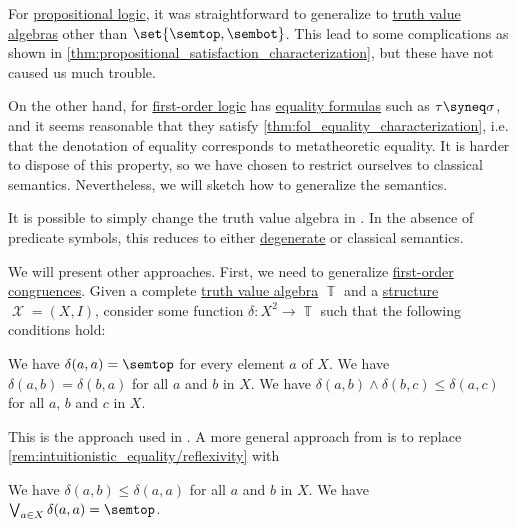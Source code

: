 \begin{remark}\label{rem:intuitionistic_equality}
  For \hyperref[def:propositional_logic]{propositional logic}, it was straightforward to generalize  to \hyperref[def:truth_value_algebra]{truth value algebras} other than \( \set{ \semtop, \sembot } \). This lead to some complications as shown in \cref{thm:propositional_satisfaction_characterization}, but these have not caused us much trouble.

  On the other hand, for \hyperref[def:first_order_logic]{first-order logic} has \hyperref[def:fol_formula]{equality formulas} such as \( \tau \syneq \sigma \), and it seems reasonable that they satisfy \cref{thm:fol_equality_characterization}, i.e. that the denotation of equality corresponds to metatheoretic equality. It is harder to dispose of this property, so we have chosen to restrict ourselves to classical semantics. Nevertheless, we will sketch how to generalize the semantics.

  It is possible to simply change the truth value algebra in . In the absence of predicate symbols, this reduces to either \hyperref[def:truth_value_algebra/degenerate]{degenerate} or classical semantics.

  We will present other approaches. First, we need to generalize \hyperref[def:fol_congruence]{first-order congruences}. Given a complete \hyperref[def:truth_value_algebra]{truth value algebra} \( \BbbT \) and a \hyperref[def:fol_structure]{structure} \( \mscrX = (X, I) \), consider some function \( \delta: X^2 \to \BbbT \) such that the following conditions hold:
  \begin{thmenum}[series=rem:intuitionistic_equality]
     We have \( \delta(a, a) = \semtop \) for every element \( a \) of \( X \).
     We have \( \delta(a, b) = \delta(b, a) \) for all \( a \) and \( b \) in \( X \).
     We have \( \delta(a, b) \wedge \delta(b, c) \leq \delta(a, c) \) for all \( a \), \( b \) and \( c \) in \( X \).
  \end{thmenum}

  This is the approach used in \cite[def. 6.2]{TroelstraVanDalen1988ConstructivismVol2}. A more general approach from \cite[100]{Драгалин1979Интуиционизм} is to replace \ref{rem:intuitionistic_equality/reflexivity} with
  \begin{thmenum}[resume=rem:intuitionistic_equality]
     We have \( \delta(a, b) \leq \delta(a, a) \) for all \( a \) and \( b \) in \( X \).
     We have \( \bigvee_{a \in X} \delta(a, a) = \semtop \).
  \end{thmenum}


\end{remark}

